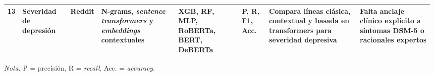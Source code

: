 \begin{table}[!t]
\begin{adjustbox}{max width=\textwidth}
\begin{tabular}{P{0.05\textwidth} P{0.11\textwidth} P{0.12\textwidth} P{0.13\textwidth} P{0.12\textwidth} P{0.08\textwidth} P{0.19\textwidth} P{0.17\textwidth}}
13 & Severidad de depresión & Reddit & N-grams, \textit{sentence transformers} y \textit{embeddings} contextuales & XGB, RF, MLP, RoBERTa, BERT, DeBERTa & P, R, F1, Acc. & Compara líneas clásica, contextual y basada en transformers para severidad depresiva & Falta anclaje clínico explícito a síntomas DSM-5 o racionales expertos \\
\bottomrule
\end{tabular}
\end{adjustbox}
\vspace{2pt}

\scriptsize\textit{Nota.} P = precisión, R = \textit{recall}, Acc. = \textit{accuracy}.
\end{table}
